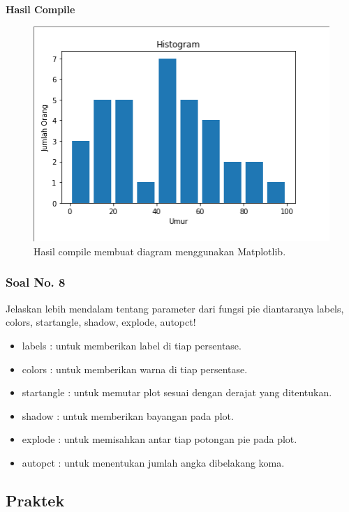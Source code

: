 

\hfill \break
\textbf{Hasil Compile}

\begin{figure}[H]
	\includegraphics[width=12cm]{figures/6/1174089/Praktek/histogram.png}
	\centering
	\caption{Hasil compile membuat diagram menggunakan Matplotlib.}
\end{figure}

\subsubsection{Soal No. 8}
\hfill \break
 Jelaskan lebih mendalam tentang parameter dari fungsi pie diantaranya labels, colors, startangle, shadow, explode, autopct!
 
 \begin{itemize}
 	\item labels : untuk memberikan label di tiap persentase.
 	\item colors : untuk memberikan warna di tiap persentase.
 	\item startangle : untuk memutar plot sesuai dengan derajat yang ditentukan.
 	\item shadow : untuk memberikan bayangan pada plot.
 	\item explode : untuk memisahkan antar tiap potongan pie pada plot.
 	\item autopct : untuk menentukan jumlah angka dibelakang koma.
 \end{itemize}

\subsection{Praktek}
